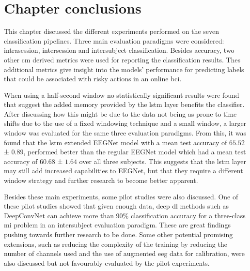 \section{Chapter conclusions}
\label{sec:evaluation_conclusions}

This chapter discussed the different experiments performed on the seven classification pipelines.
Three main evaluation paradigms were considered: intrasession, intersession and intersubject classification.
Besides accuracy, two other \gls{cm} derived metrics were used for reporting the classification results.
Thes additional metrics give insight into the models' performance for predicting labels that could be associated with risky actions in an online \gls{bci}.

When using a half-second window no statistically significant results were found that suggest the added memory provided by the \gls{lstm} layer benefits the classifier.
After discussing how this might be due to the data not being as prone to time shifts due to the use of a fixed windowing technique and a small window, a larger window was evaluated for the same three evaluation paradigms.
From this, it was found that the \gls{lstm} extended EEGNet model with a mean test accuracy of $65.52$ ± $0.89$, performed better than the regular EEGNet model which had a mean test accuracy of $60.68$ ± $1.64$ over all three subjects.
This suggests that the \gls{lstm} layer may still add increased capabilities to EEGNet, but that they require a different window strategy and further research to become better apparent.

Besides these main experiments, some pilot studies were also discussed.
One of these pilot studies showed that given enough data, deep \gls{dl} methods such as DeepConvNet can achieve more than 90\% classification accuracy for a three-class \gls{mi} problem in an intersubject evaluation paradigm.
These are great findings pushing towards further research to be done.
Some other potential promising extensions, such as reducing the complexity of the training by reducing the number of channels used and the use of augmented \gls{eeg} data for calibration, were also discussed but not favourably evaluated by the pilot experiments.
